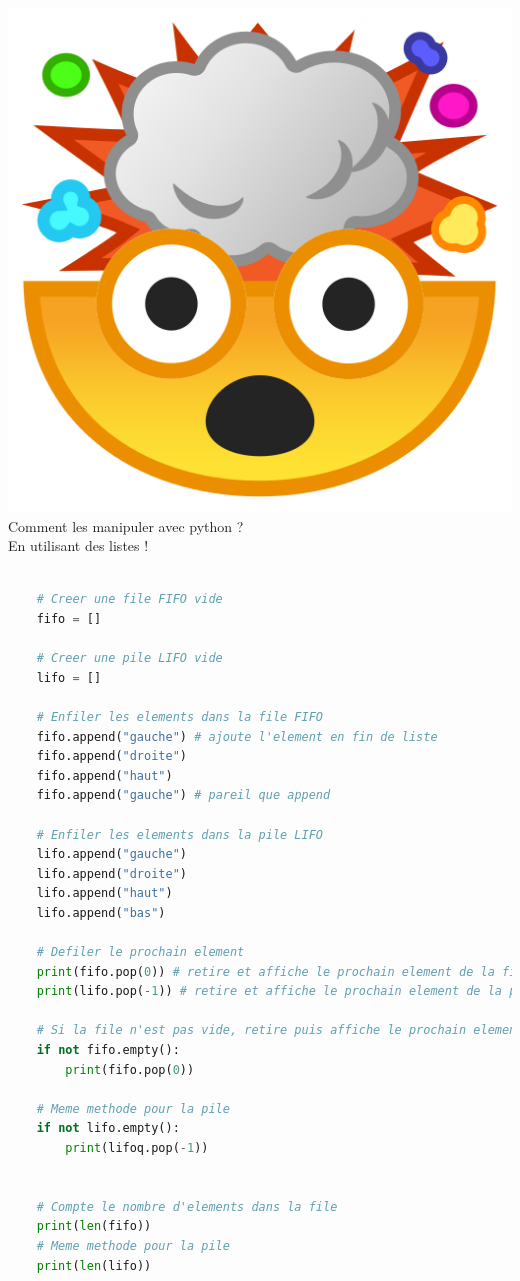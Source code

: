 \includegraphics[scale=0.03]{Common_blob/mindblow.png}{\selectfont
Comment les manipuler avec python ?
}\\[0.5cm]
En utilisant des listes !
\begin{lstlisting}[language=Python]

    # Creer une file FIFO vide 
    fifo = []

    # Creer une pile LIFO vide 
    lifo = []
    
    # Enfiler les elements dans la file FIFO
    fifo.append("gauche") # ajoute l'element en fin de liste
    fifo.append("droite")
    fifo.append("haut")
    fifo.append("gauche") # pareil que append

    # Enfiler les elements dans la pile LIFO
    lifo.append("gauche")
    lifo.append("droite")
    lifo.append("haut")
    lifo.append("bas") 

    # Defiler le prochain element
    print(fifo.pop(0)) # retire et affiche le prochain element de la file
    print(lifo.pop(-1)) # retire et affiche le prochain element de la pile

    # Si la file n'est pas vide, retire puis affiche le prochain element
    if not fifo.empty():
        print(fifo.pop(0)) 

    # Meme methode pour la pile
    if not lifo.empty():
        print(lifoq.pop(-1)) 


    # Compte le nombre d'elements dans la file
    print(len(fifo))
    # Meme methode pour la pile
    print(len(lifo))

\end{lstlisting}

